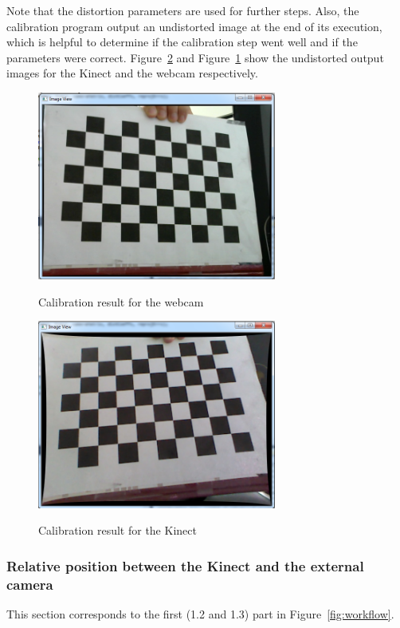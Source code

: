 Note that the distortion parameters are used for further steps. Also, the calibration program output an undistorted image at the end of its execution, which is helpful to determine if the calibration step went well and if the parameters were correct. Figure~\ref{fig:calibration result for the kinect} and Figure~\ref{fig:calibration result for the webcam} show the undistorted output images for the Kinect and the webcam respectively.        

\begin{figure}
\caption{Calibration result for the webcam}
\centering
    \includegraphics[width=0.7\textwidth]{images/resultCalibWebcam.png}
\label{fig:calibration result for the webcam}
\end{figure}

\begin{figure}
\caption{Calibration result for the Kinect}
\centering
    \includegraphics[width=0.7\textwidth]{images/resultCalibKinect.png}
\label{fig:calibration result for the kinect}
\end{figure}

\subsubsection{Relative position between the Kinect and the external camera}
\label{sec:Relative position between the Kinect and the external camera}
This section corresponds to the first (1.2 and 1.3) part in Figure~\ref{fig:workflow}.\\


